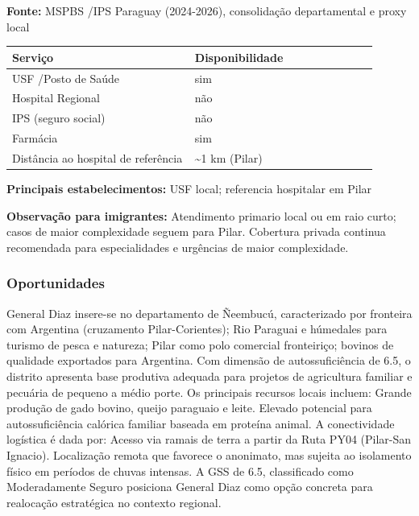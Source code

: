 \textbf{Fonte:} MSPBS /\allowbreak  IPS Paraguay (2024-2026), consolidação
departamental e proxy local

{\def\LTcaptype{none} %
\begin{longtable}{@{}>{\raggedright\arraybackslash}p{0.45\linewidth} >{\raggedright\arraybackslash}p{0.45\linewidth}@{}}
\toprule\noalign{}
Serviço & Disponibilidade \\
\midrule\noalign{}
\endhead
\bottomrule\noalign{}
\endlastfoot
USF /\allowbreak  Posto de Saúde & sim \\
Hospital Regional & não \\
IPS (seguro social) & não \\
Farmácia & sim \\
Distância ao hospital de referência & \textasciitilde1 km (Pilar) \\
\end{longtable}
}

\textbf{Principais estabelecimentos:} USF local; referencia hospitalar
em Pilar

\textbf{Observação para imigrantes:} Atendimento primario local ou em
raio curto; casos de maior complexidade seguem para Pilar. Cobertura
privada continua recomendada para especialidades e urgências de maior
complexidade.
\newpage

\subsubsection*{Oportunidades}\label{oport-general-diaz-1205}
General Diaz insere-se no departamento de Ñeembucú, caracterizado por fronteira com Argentina (cruzamento Pilar-Corientes); Rio Paraguai e húmedales para turismo de pesca e natureza; Pilar como polo comercial fronteiriço; bovinos de qualidade exportados para Argentina. Com dimensão de autossuficiência de 6.5, o distrito apresenta base produtiva adequada para projetos de agricultura familiar e pecuária de pequeno a médio porte. Os principais recursos locais incluem: Grande produção de gado bovino, queijo paraguaio e leite. Elevado potencial para autossuficiência calórica familiar baseada em proteína animal. A conectividade logística é dada por: Acesso via ramais de terra a partir da Ruta PY04 (Pilar-San Ignacio). Localização remota que favorece o anonimato, mas sujeita ao isolamento físico em períodos de chuvas intensas. A GSS de 6.5, classificado como Moderadamente Seguro posiciona General Diaz como opção concreta para realocação estratégica no contexto regional.

